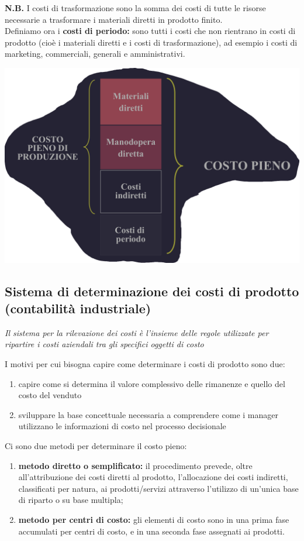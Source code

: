\documentclass{article}
\begin{document}
\textbf{N.B.} I costi di trasformazione sono la somma dei costi di tutte le risorse necessarie a trasformare i materiali diretti in prodotto finito.
\vspace*{0.2cm}\\
Definiamo ora i \textbf{costi di periodo:} sono tutti i costi che non rientrano in costi di prodotto (cioè i materiali diretti e i costi di trasformazione), ad esempio i costi di marketing, commerciali, generali e amministrativi.
\begin{center}
    \includegraphics[scale=0.22]{Image/ElemCosto_2.png}
\end{center}



\subsection{Sistema di determinazione dei costi di prodotto (contabilità industriale)}
\begin{center}
    \textit{Il sistema per la rilevazione dei costi è l'insieme delle regole utilizzate per ripartire i costi aziendali tra gli specifici oggetti di costo }
\end{center}
I motivi per cui bisogna capire come determinare i costi di prodotto sono due:
\begin{enumerate}
    \item capire come si determina il valore complessivo delle rimanenze e quello del costo del venduto
    \item sviluppare la base concettuale necessaria a comprendere come i manager utilizzano le informazioni di costo nel processo decisionale
\end{enumerate}
Ci sono due metodi per determinare il costo pieno:
\begin{enumerate}
    \item \textbf{metodo diretto o semplificato:} il procedimento prevede, oltre all'attribuzione dei costi diretti al prodotto, l'allocazione dei costi indiretti, classificati per natura, ai prodotti/servizi
    attraverso l'utilizzo di un'unica base di riparto o su base multipla;
    \item \textbf{metodo per centri di costo:} gli elementi di costo sono in una prima fase accumulati per centri di costo, e in una seconda fase assegnati ai prodotti.
\end{enumerate}
\end{document}
